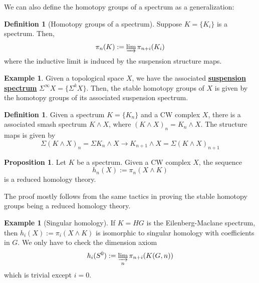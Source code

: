 \documentclass{article}
\theoremstyle{definition}
\newtheorem{definition}[theorem]{Definition}
\newtheorem{proposition}[theorem]{Proposition}
\newtheorem{example}[theorem]{Example}
\begin{document}
We can also define the homotopy groups of a spectrum as a generalization:

\begin{tcolorbox}[colback=purple!5!white,colframe=purple!75!black]
\begin{definition}[Homotopy groups of a spectrum]
Suppose $K=\{K_i\}$ is a spectrum. Then, 
\[\pi_n(K):=\varinjlim \pi_{n+i}(K_i)\]
where the inductive limit is induced by the suspension structure maps. 
\end{definition}
\end{tcolorbox}

\begin{tcolorbox}[colback=yellow!5!white,colframe=yellow!30!white]
\begin{example}
Given a topological space $X$, we have the associated \underline{\textbf{suspension spectrum}} $\Sigma^{\infty}X=\{\Sigma^kX\}$. Then, the stable homotopy groups of $X$ is given by the homotopy groups of its associated suspension spectrum. 
\end{example}
\end{tcolorbox}

\begin{tcolorbox}[colback=purple!5!white,colframe=purple!75!black]
\begin{definition}
Given a spectrum $K=\{K_n\}$ and a CW complex $X$, there is a associated smash spectrum $K\wedge X$, where $(K\wedge X)_n=K_n\wedge X$. The structure maps is given by 
\[\Sigma (K\wedge X)_n =\Sigma K_n\wedge X\to K_{n+1}\wedge X=\Sigma (K\wedge X)_{n+1}\]
\end{definition}
\end{tcolorbox}

\begin{tcolorbox}[colback=blue!5!white,colframe=blue!30!white]
\begin{proposition}
\label{homologyrep}
Let $K$ be a spectrum. Given a CW complex $X$, the sequence
\[h_n(X):=\pi_n(X\wedge K)\]
is a reduced homology theory.
\end{proposition}
\end{tcolorbox}
The proof mostly follows from the same tactics in proving the stable homotopy groups being a reduced homology theory.
\begin{tcolorbox}[colback=yellow!5!white,colframe=yellow!30!white]
\begin{example}[Singular homology]
If $K=HG$ is the Eilenberg-Maclane spectrum, then $h_i(X):=\pi_i(X\wedge K)$ is isomorphic to singular homology with coefficients in $G$. We only have to check the dimension axiom 
\[h_i(S^0):=\varinjlim_n \pi_{n+i}(K(G,n))\]
which is trivial except $i=0$. 
\end{example}
\end{tcolorbox}
\end{document}
